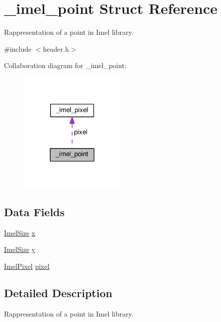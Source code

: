 \hypertarget{struct__imel__point}{}\section{\+\_\+imel\+\_\+point Struct Reference}
\label{struct__imel__point}


Rappresentation of a point in Imel library.  




{\ttfamily \#include $<$header.\+h$>$}



Collaboration diagram for \+\_\+imel\+\_\+point\+:
\nopagebreak
\begin{figure}[H]
\begin{center}
\leavevmode
\includegraphics[width=146pt]{struct__imel__point__coll__graph}
\end{center}
\end{figure}
\subsection*{Data Fields}
{\bf }\par
\begin{DoxyCompactItemize}
\item 
\hyperlink{header_8h_af8a2b40c34eeed326846d0098ea84ec2}{Imel\+Size} \hyperlink{struct__imel__point_ae691eec1e0fdf37d07d13d44a0e0539c}{x}
\item 
\hyperlink{header_8h_af8a2b40c34eeed326846d0098ea84ec2}{Imel\+Size} \hyperlink{struct__imel__point_a30dc84507e749f7157cecd08cb045b4e}{y}
\item 
\hyperlink{header_8h_add7dd9f8c093208bc4fd135a22a670ba}{Imel\+Pixel} \hyperlink{struct__imel__point_af4b99377296131681a16ab67599c152b}{pixel}
\end{DoxyCompactItemize}



\subsection{Detailed Description}
Rappresentation of a point in Imel library. 


